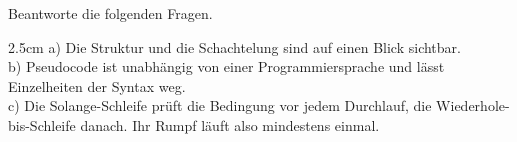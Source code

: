 \question[3]
Beantworte die folgenden Fragen.
\begin{solutionbox}{2.5cm}
a) Die Struktur und die Schachtelung sind auf einen Blick sichtbar. \\
b) Pseudocode ist unabhängig von einer Programmiersprache und lässt Einzelheiten der Syntax weg. \\
c) Die Solange-Schleife prüft die Bedingung vor jedem Durchlauf, die Wiederhole-bis-Schleife danach. Ihr Rumpf läuft
also mindestens einmal.
\end{solutionbox}
